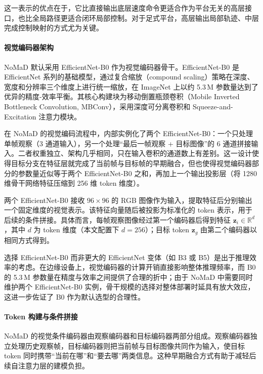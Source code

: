 这一表示的优点在于，它比直接输出底层速度命令更适合作为平台无关的高层接口，也比全局路径更适合闭环局部控制。对于足式平台，高层输出局部轨迹、中层完成控制映射的方式尤为关键。

\paragraph*{视觉编码器架构}

NoMaD 默认采用 EfficientNet-B0 作为视觉编码器骨干\cite{efficientnet2019}。EfficientNet-B0 是 EfficientNet 系列的基础模型，通过复合缩放（compound scaling）策略在深度、宽度和分辨率三个维度上进行统一缩放，在 ImageNet 上以约 5.3\,M 参数量达到了优异的精度-效率平衡。其核心构建块为移动倒置瓶颈卷积（Mobile Inverted Bottleneck Convolution, MBConv），采用深度可分离卷积和 Squeeze-and-Excitation 注意力模块。

在 NoMaD 的视觉编码流程中，内部实例化了两个 EfficientNet-B0：一个只处理单帧观察（3 通道输入），另一个处理``最后一帧观察 + 目标图像''的 6 通道拼接输入。二者权重独立、架构几乎相同，只在输入卷积的通道数上有差别。这一设计使得目标分支在特征层就完成了当前帧与目标帧的早期融合，但也使得视觉编码器部分的参数量近似等于两个 EfficientNet-B0 之和，再加上一个输出投影层（将 1280 维骨干网络特征压缩到 256 维 token 维度）。

两个 EfficientNet-B0 接收 $96 \times 96$ 的 RGB 图像作为输入，提取特征后分别输出一个固定维度的视觉表示。该特征向量随后被投影为标准化的 token 表示，用于后续的条件拼接。具体而言，每帧观察图像经过第一个编码器后得到特征 $\mathbf{z}_i \in \mathbb{R}^d$，其中 $d$ 为 token 维度（本文配置下 $d=256$）；目标 token $\mathbf{z}_g$ 由第二个编码器以相同方式得到。

选择 EfficientNet-B0 而非更大的 EfficientNet 变体（如 B3 或 B5）是出于推理效率的考虑。在边缘设备上，视觉编码器的计算开销直接影响整体推理频率，而 B0 的 5.3\,M 参数量在精度与效率之间提供了合理的折中；由于 NoMaD 中需要同时维护两个 EfficientNet-B0 实例，骨干规模的选择对整体部署时延具有放大效应，这进一步佐证了 B0 作为默认选型的合理性。

\paragraph*{Token 构建与条件拼接}

NoMaD 的视觉条件编码器由观察编码器和目标编码器两部分组成。观察编码器独立处理历史观察帧，目标编码器则把当前帧与目标图像共同作为输入，使目标 token 同时携带``当前在哪''和``要去哪''两类信息。这种早期融合方式有助于减轻后续自注意力层的建模负担。

